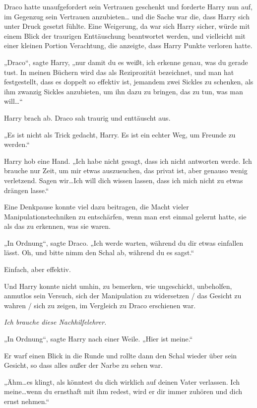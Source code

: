 {Draco hatte unaufgefordert sein Vertrauen geschenkt und forderte Harry nun auf, im Gegenzug sein Vertrauen anzubieten… und die Sache war die, dass Harry sich unter Druck gesetzt fühlte. Eine Weigerung, da war sich Harry sicher, würde mit einem Blick der traurigen Enttäuschung beantwortet werden, und vielleicht mit einer kleinen Portion Verachtung, die anzeigte, dass Harry Punkte verloren hatte.

„Draco“, sagte Harry, „nur damit du es weißt, ich erkenne genau, was du gerade tust. In meinen Büchern wird das als Reziprozität bezeichnet, und man hat festgestellt, dass es doppelt so effektiv ist, jemandem zwei Sickles zu schenken, als ihm zwanzig Sickles anzubieten, um ihn dazu zu bringen, das zu tun, was man will…“

Harry brach ab. Draco sah traurig und enttäuscht aus.

„Es ist nicht als Trick gedacht, Harry. Es ist ein echter Weg, um Freunde zu werden.“

Harry hob eine Hand. „Ich habe nicht gesagt, dass ich nicht antworten werde. Ich brauche nur Zeit, um mir etwas auszusuchen, das privat ist, aber genauso wenig verletzend. Sagen wir…Ich will dich wissen lassen, dass ich mich nicht zu etwas drängen lasse.“

Eine Denkpause konnte viel dazu beitragen, die Macht vieler Manipulationstechniken zu entschärfen, wenn man erst einmal gelernt hatte, sie als das zu erkennen, was sie waren.

„In Ordnung“, sagte Draco. „Ich werde warten, während du dir etwas einfallen lässt. Oh, und bitte nimm den Schal ab, während du es sagst.“

Einfach, aber effektiv.

Und Harry konnte nicht umhin, zu bemerken, wie ungeschickt, unbeholfen, anmutlos sein Versuch, sich der Manipulation zu widersetzen / das Gesicht zu wahren / sich zu zeigen, im Vergleich zu Draco erschienen war.

\emph{Ich brauche diese Nachhilfelehrer.}

„In Ordnung“, sagte Harry nach einer Weile. „Hier ist meine.“

Er warf einen Blick in die Runde und rollte dann den Schal wieder über sein Gesicht, so dass alles außer der Narbe zu sehen war.

„Ähm…es klingt, als könntest du dich wirklich auf deinen Vater verlassen. Ich meine…wenn du ernsthaft mit ihm redest, wird er dir immer zuhören und dich ernst nehmen.“

}
